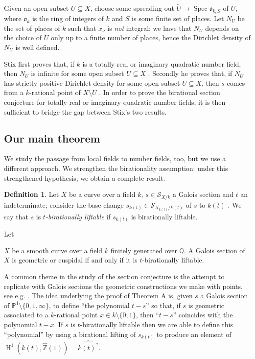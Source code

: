 \documentclass[11pt]{amsart}
\theoremstyle{plain}
\theoremstyle{definition}
\newtheorem*{definition*}{Definition}
\newcommand{\on}{\operatorname}
\newcommand{\1}{\mathbb{1}}
\newcommand{\hz}{\hat{\mathbb{Z}}}
\newcommand{\mc}{\mathcal}
\newcommand{\mf}{\mathfrak}
\newcommand{\Q}{\mathbb{Q}}
\newcommand{\s}{\subseteq}
\newcommand{\spec}{\on{Spec}}
\renewcommand{\H}{\on{H}}
\renewcommand{\P}{\mathbb{P}}
\renewcommand{\tilde}{\widetilde}
\renewcommand{\hat}{\widehat}
\begin{document}
Given an open subset $U\s X$, choose some spreading out $\tilde{U}\to\spec \mf{o}_{k,S}$ of $U$, where $\mf{o}_{k}$ is the ring of integers of $k$ and $S$ is some finite set of places. Let $N_{U}$ be the set of places of $k$ such that $x_{\nu}$ is \emph{not} integral: we have that $N_{U}$ depends on the choice of $\tilde{U}$ only up to a finite number of places, hence the Dirichlet density of $N_{U}$ is well defined.

Stix first proves that, if $k$ is a totally real or imaginary quadratic number field, then $N_{U}$ is infinite for some open subset $U\s X$ \cite[Theorem A]{sti15}. Secondly he proves that, if $N_{U}$ has strictly positive Dirichlet density for some open subset $U\s X$, then $s$ comes from a $k$-rational point of $X\setminus U$ \cite[Theorem B]{sti15}. In order to prove the birational section conjecture for totally real or imaginary quadratic number fields, it is then sufficient to bridge the gap between Stix's two results.

\subsection{Our main theorem}

We study the passage from local fields to number fields, too, but we use a different approach. We strengthen the birationality assumption: under this strengthened hypothesis, we obtain a complete result.

\begin{definition*}
    Let $X$ be a curve over a field $k$, $s\in\mc{S}_{X/k}$ a Galois section and $t$ an indeterminate; consider the base change $s_{k(t)}\in\mc{S}_{X_{k(t)}/k(t)}$ of $s$ to $k(t)$ \cite[Definition 27]{sti13}. We say that $s$ is \emph{$t$-birationally liftable} if $s_{k(t)}$ is birationally liftable.
\end{definition*}

\begin{TA}
    \hypertarget{TA}{Let} $X$ be a smooth curve over a field $k$ finitely generated over $\Q$. A Galois section of $X$ is geometric or cuspidal if and only if it is $t$-birationally liftable.
\end{TA}

A common theme in the study of the section conjecture is the attempt to replicate with Galois sections the geometric constructions we make with points, see e.g. \cite[Chapter 3]{sti13}. The idea underlying the proof of \hyperlink{TA}{Theorem A} is, given $s$ a Galois section of $\P^{1}\setminus\{0,1,\infty\}$, to define ``the polynomial $t-s$'' so that, if $s$ is geometric associated to a $k$-rational point $x \in k\setminus\{0,1\}$, then ``$t-s$'' coincides with the polynomial $t-x$. If $s$ is $t$-birationally liftable then we are able to define this ``polynomial'' by using a birational lifting of $s_{k(t)}$ to produce an element of $\H^{1}(k(t),\hz(1))=\hat{k(t)^{*}}$.
\end{document}
